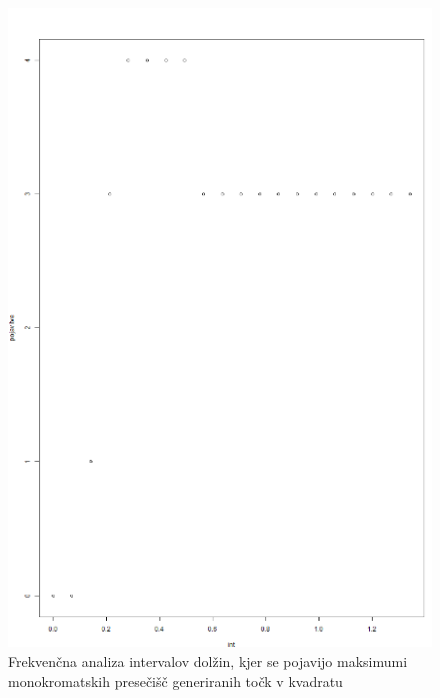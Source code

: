 \documentclass[12pt, a4paper]{article}
\begin{document}
	\begin{figure}[h!]
		\caption{Frekvenčna analiza intervalov dolžin, kjer se pojavijo maksimumi monokromatskih presečišč generiranih točk v kvadratu}
		\includegraphics[scale=0.6]{frekvencni_dolzin}
		\centering
	\end{figure}
\end{document}
